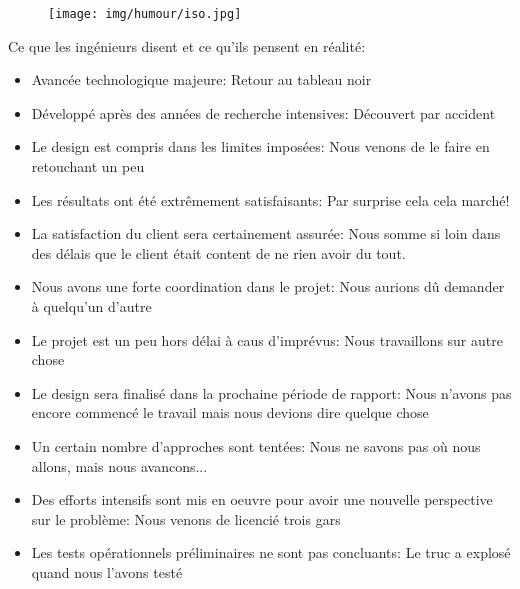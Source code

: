 	\begin{figure}[H]
		\begin{center}
		\texttt{[image: img/humour/iso.jpg]}
		\end{center}	
	\end{figure}
	
	\begin{center}\underline{\hspace{5 cm}}\end{center}

	Ce que les ingénieurs disent et ce qu'ils pensent en réalité:

	\begin{itemize} 
		\item Avancée technologique majeure: Retour au tableau noir

		\item Développé après des années de recherche intensives: Découvert par accident

		\item Le design est compris dans les limites imposées: Nous venons de le faire en retouchant un peu

		\item Les résultats ont été extrêmement satisfaisants: Par surprise cela cela marché!

		\item La satisfaction du client sera certainement assurée: Nous somme si loin dans des délais que le client était content de ne rien avoir du tout.

		\item Nous avons une forte coordination dans le projet: Nous aurions dû demander à quelqu'un d'autre

		\item Le projet est un peu hors délai à caus d'imprévus: Nous travaillons sur autre chose

		\item Le design sera finalisé dans la prochaine période de rapport: Nous n'avons pas encore commencé le travail mais nous devions dire quelque chose

		\item Un certain nombre d'approches sont tentées: Nous ne savons pas où nous allons, mais nous avancons...

		\item Des efforts intensifs sont mis en oeuvre pour avoir une nouvelle perspective sur le problème: Nous venons de licencié trois gars

		\item Les tests opérationnels préliminaires ne sont pas concluants: Le truc a explosé quand nous l'avons testé


\end{itemize}
